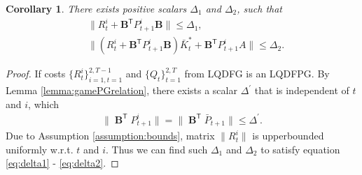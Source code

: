 \documentclass[letterpaper, 10 pt, conference]{ieeeconf}  %
\newcommand{\transpose}{\mathsf{T}}
\DeclareMathOperator{\contB}{\mathbf{B}}
\newtheorem{corollary}{Corollary}
\begin{document}
\begin{corollary}\label{corollary:Delta}
    There exists positive scalars $\Delta_{1}$ and $\Delta_{2}$, such that
    \begin{align}
    \label{eq:delta1}
        &\|R_{t}^{i}+\mathbf{B}^{\transpose}P_{t+1}^{i}\mathbf{B}\| \leq \Delta_{1},\\
        \label{eq:delta2}
        &\|(R_{t}^{i}+\mathbf{B}^{\transpose}P_{t+1}^{i}\mathbf{B})\bar{K}_{t}^{*}+\mathbf{B}^{\transpose}P_{t+1}^{i}A\| \leq \Delta_{2}.
    \end{align}
\end{corollary}
\begin{proof}
    If costs $\{R_{t}^{i}\}_{i=1,t=1}^{2,T-1}$ and $\{Q_{t}\}_{t=1}^{2,T}$ from LQDFG is an LQDFPG. By Lemma \ref{lemma:gamePGrelation}, there exists a scalar $\Delta^{'}$ that is independent of $t$ and $i$, which
    \begin{align*}
        \|\contB^{\transpose}P_{t+1}^{i}\| = \|\contB^{\transpose}\bar{P}_{t+1}\| \leq \Delta^{'}.
    \end{align*}
    Due to Assumption \ref{assumption:bounds}, matrix $\|R_{t}^{i}\|$ is upperbounded uniformly w.r.t. $t$ and $i$. Thus we can find such $\Delta_{1}$ and $\Delta_{2}$ to satisfy equation \eqref{eq:delta1} - \eqref{eq:delta2}.
\end{proof}
\end{document}
